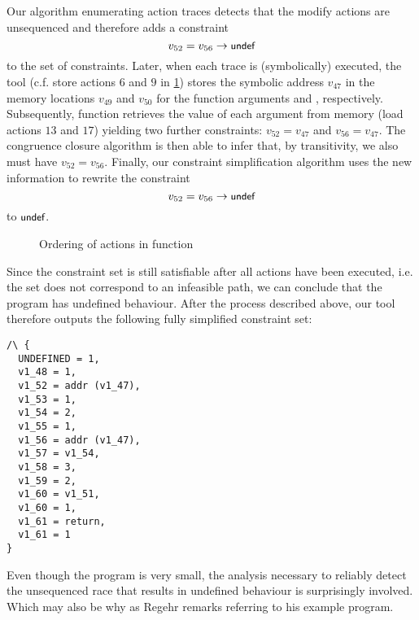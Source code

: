 \documentclass[a4paper,12pt]{scrbook}
\theoremstyle{plain}
\theoremstyle{definition}
\newcommand{\sem}[1]{{\small{\textsf{#1}}}}
\newcommand{\cc}[1]{{\text{\footnotesize\ttfamily{#1}}}}
\begin{document}
Our algorithm enumerating action traces detects that the modify actions are
unsequenced and therefore adds a constraint
\begin{equation*}
v_{52} = v_{56} \rightarrow \sem{undef}
\end{equation*}
to the set of constraints. Later, when each trace is (symbolically) executed,
the tool (c.f. store actions $6$ and $9$ in \ref{ptrRegehrMain}) stores the
symbolic address $v_{47}$ in the memory locations $v_{49}$ and $v_{50}$ for the
function arguments \cc{p1} and \cc{p2}, respectively. Subsequently, function
\cc{foo} retrieves the value of each argument from memory (load actions $13$ and
$17$) yielding two further constraints: $v_{52} = v_{47}$ and $v_{56} =
v_{47}$. The congruence closure algorithm is then able to infer that, by
transitivity, we also must have $v_{52} = v_{56}$. Finally, our constraint
simplification algorithm uses the new information to rewrite the
constraint
\begin{equation*}
v_{52} = v_{56} \rightarrow \sem{undef}
\end{equation*}
to $\sem{undef}$.
\begin{figure}[htb]
\centering
\caption{Ordering of actions in function \cc{main}}
\label{ptrRegehrMain}
\end{figure}

Since the constraint set is still satisfiable after all actions have been
executed, i.e. the set does not correspond to an infeasible path, we can
conclude that the program has undefined behaviour. After the process described
above, our tool therefore outputs the following fully simplified constraint set:
\begin{lstlisting}
/\ {
  UNDEFINED = 1,
  v1_48 = 1,
  v1_52 = addr (v1_47),
  v1_53 = 1,
  v1_54 = 2,
  v1_55 = 1,
  v1_56 = addr (v1_47),
  v1_57 = v1_54,
  v1_58 = 3,
  v1_59 = 2,
  v1_60 = v1_51,
  v1_60 = 1,
  v1_61 = return,
  v1_61 = 1
}
\end{lstlisting}

Even though the program is very small, the analysis necessary to reliably detect
the unsequenced race that results in undefined behaviour is surprisingly
involved. Which may also be why  as Regehr remarks referring to his example program.
\end{document}
